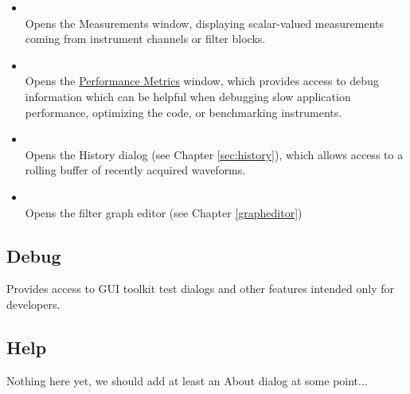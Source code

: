 \begin{itemize}
\item {}\\
Opens the Measurements window, displaying scalar-valued measurements coming from instrument channels or filter blocks.

\item {}\\
Opens the \hyperref[dlg:perfemetrics]{Performance Metrics} window, which provides access to debug information which can
be helpful when debugging slow application performance, optimizing the code, or benchmarking instruments.

\item {}\\
Opens the History dialog (see Chapter \ref{sec:history}), which allows access to a rolling buffer of recently acquired
waveforms.

\item {}\\
Opens the filter graph editor (see Chapter \ref{grapheditor})

\end{itemize}


\subsection{Debug}

Provides access to GUI toolkit test dialogs and other features intended only for developers.


\subsection{Help}

Nothing here yet, we should add at least an About dialog at some point...


